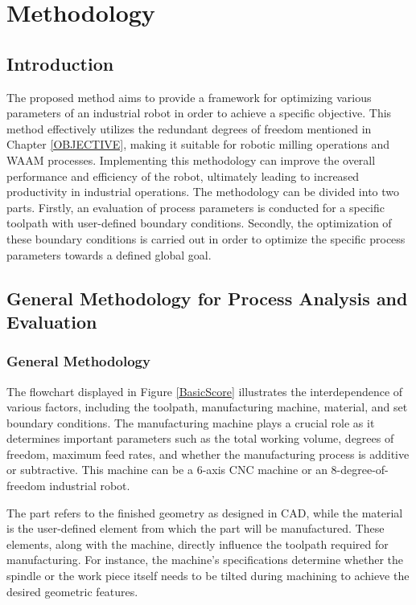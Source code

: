 \chapter{Methodology}\label{METmain}

\section{Introduction}%

The proposed method aims to provide a framework for optimizing various parameters of an industrial robot in order to achieve a specific objective. This method effectively utilizes the redundant degrees of freedom mentioned in Chapter \ref{OBJECTIVE}, making it suitable for robotic milling operations and WAAM processes. Implementing this methodology can improve the overall performance and efficiency of the robot, ultimately leading to increased productivity in industrial operations. The methodology can be divided into two parts. Firstly, an evaluation of process parameters is conducted for a specific toolpath with user-defined boundary conditions. Secondly, the optimization of these boundary conditions is carried out in order to optimize the specific process parameters towards a defined global goal.

\section{General Methodology for Process Analysis and Evaluation}
\subsection{General Methodology}\label{general}

The flowchart displayed in Figure \ref{BasicScore} illustrates the interdependence of various factors, including the toolpath, manufacturing machine, material, and set boundary conditions. The manufacturing machine plays a crucial role as it determines important parameters such as the total working volume, degrees of freedom, maximum feed rates, and whether the manufacturing process is additive or subtractive. This machine can be a 6-axis CNC machine or an 8-degree-of-freedom industrial robot.

The part refers to the finished geometry as designed in CAD, while the material is the user-defined element from which the part will be manufactured. These elements, along with the machine, directly influence the toolpath required for manufacturing. For instance, the machine's specifications determine whether the spindle or the work piece itself needs to be tilted during machining to achieve the desired geometric features.

